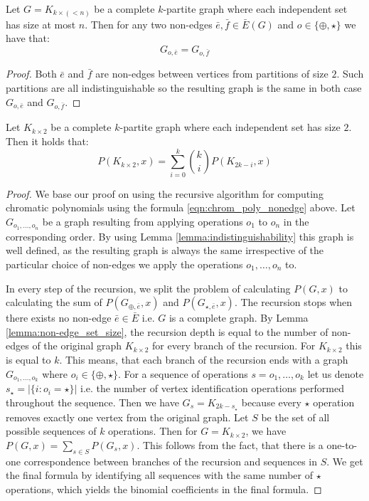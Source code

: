 \begin{lemma}
\label{lemma:indistinguishability}
    Let $G = K_{k \times (<n)}$ be a complete $k$-partite graph where each independent set has size at most $n$. Then for any two non-edges $\bar{e},\bar{f} \in \bar{E}(G)$ and $o \in \{\oplus,\star\}$ we have that: 
    \[ G_{o,\bar{e}} = G_{o,\bar{f}}\]
\end{lemma}

\begin{proof}
    Both $\bar{e}$ and $\bar{f}$ are non-edges between vertices from partitions of size $2$. Such partitions are all indistinguishable so the resulting graph is the same in both case $G_{o,\bar{e}}$ and $G_{o,\bar{f}}$.
\end{proof}

\begin{claim}
    Let $K_{k \times 2}$ be a complete $k$-partite graph where each independent set has size $2$. Then it holds that: 
    \begin{equation}\label{eqn:chromatic-pascal}
        P(K_{k \times 2},x) = \sum_{i=0}^{k} \binom{k}{i} P(K_{2k-i},x)
    \end{equation}
\end{claim}

\begin{proof}
    We base our proof on using the recursive algorithm for computing chromatic polynomials using the formula \ref{eqn:chrom_poly_nonedge} above. Let $G_{o_1,\ldots,o_n}$ be a graph resulting from applying operations $o_1$ to $o_n$ in the corresponding order. By using Lemma \ref{lemma:indistinguishability} this graph is well defined, as the resulting graph is always the same irrespective of the particular choice of non-edges we apply the operations $o_1, \ldots,o_n$ to.

    In every step of the recursion, we split the problem of calculating $P(G,x)$ to calculating the sum of $P(G_{\oplus,\bar{e}},x)$ and $P(G_{\star,\bar{e}},x)$. The recursion stops when there exists no non-edge $\bar{e} \in \bar{E}$ i.e. $G$ is a complete graph. By Lemma \ref{lemma:non-edge_set_size}, the recursion depth is equal to the number of non-edges of the original graph $K_{k\times 2}$ for every branch of the recursion. For $K_{k\times 2}$ this is equal to $k$. This means, that each branch of the recursion ends with a graph $G_{o_1,\ldots,o_k}$ where $o_i \in \{\oplus,\star\}$. For a sequence of operations $s=o_1,\ldots,o_k$ let us denote $s_{\star} = |\{ i : o_i   =\star\}|$ i.e. the number of vertex identification operations performed throughout the sequence. Then we have $G_s = K_{2k-s_{\star}}$ because every $\star$ operation removes exactly one vertex from the original graph. Let $S$ be the set of all possible sequences of $k$ operations. Then for $G=K_{k\times 2}$, we have $P(G,x)= \sum_{s\in S}P(G_s,x)$. This follows from the fact, that there is a one-to-one correspondence between branches of the recursion and sequences in $S$. We get the final formula by identifying all sequences with the same number of $\star$ operations, which yields the binomial coefficients in the final formula. 
\end{proof}


